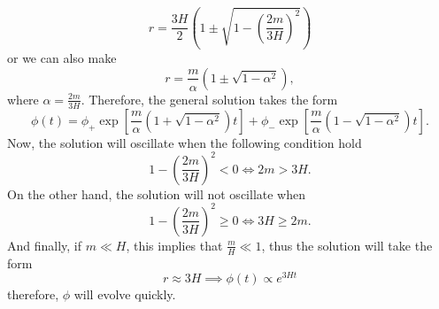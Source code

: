 \documentclass[11pt]{article}
\begin{document}
\begin{problem}
\begin{displaymath}
r = \frac{3H}{2}\left( 1 \pm \sqrt{1-\left(\frac{2m}{3H}\right )^2}\right)
\end{displaymath}
or we can also make
\begin{displaymath}
  r = \frac{m}{\alpha}(1 \pm \sqrt{1-\alpha^2}),
\end{displaymath}
where $\alpha = \frac{2m}{3H}$. Therefore, the general solution takes the form
\begin{displaymath}
  \phi(t) = \phi_{+}\exp\left[\frac{m}{\alpha}(1 + \sqrt{1-\alpha^2})t\right] + \phi_{-}\exp\left[\frac{m}{\alpha}(1 - \sqrt{1-\alpha^2})t\right].
\end{displaymath}
Now, the solution will oscillate when the following condition hold
\begin{displaymath}
  1-\left(\frac{2m}{3H}\right)^2<0 \iff 2m>3H.
\end{displaymath}
On the other hand, the solution will not oscillate when
\begin{displaymath}
  1-\left(\frac{2m}{3H}\right)^2 \geq 0 \iff 3H\geq 2m.
\end{displaymath}
And finally, if $m\ll H$, this implies that $\frac{m}{H}\ll 1$, thus the solution will take the form
\begin{displaymath}
  r\approx 3H\implies \phi(t) \propto e^{3Ht}
\end{displaymath}
therefore, $\phi$ will evolve quickly.
\end{problem}
\end{document}
